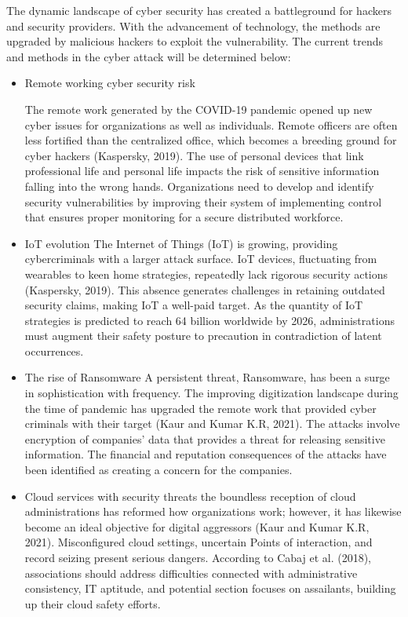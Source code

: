 The dynamic landscape of cyber security has created a battleground for hackers and security 
providers. With the advancement of technology, the methods are upgraded by malicious hackers to 
exploit the vulnerability. The current trends and methods in the cyber attack will be determined
below:
\begin{itemize}
     \item  Remote working cyber security risk

     The remote work generated by the COVID-19 pandemic opened up new cyber issues for 
     organizations as well as individuals. Remote officers are often less fortified than the 
     centralized office, which becomes a breeding ground for  cyber hackers (Kaspersky, 2019). 
     The use of personal devices that link professional life and personal life impacts the risk 
     of sensitive information falling into the wrong hands. Organizations need to develop and 
     identify security vulnerabilities by improving their system of implementing control that 
     ensures proper monitoring for a secure distributed workforce.
    \item IoT evolution 
    The Internet of Things (IoT) is growing, providing cybercriminals with a larger attack 
    surface. IoT devices, fluctuating from wearables to keen home strategies, repeatedly lack 
    rigorous security actions (Kaspersky, 2019). This absence generates challenges in retaining 
    outdated security claims, making IoT a well-paid target. As the quantity  of IoT strategies 
    is predicted to reach 64 billion worldwide by 2026, administrations must augment their 
    safety posture to precaution in contradiction of latent occurrences.

	\item The rise of Ransomware A persistent threat, Ransomware, has been a surge in 
 sophistication with frequency. 
    The improving digitization landscape during the time of pandemic has upgraded the remote 
    work that provided cyber criminals with their target (Kaur and Kumar K.R, 2021). The 
    attacks involve encryption of companies' data that provides a threat for releasing 
    sensitive information. The financial and reputation consequences of the attacks have been 
    identified as creating a concern for the companies.
    
    \item Cloud services with security threats the boundless reception of cloud administrations 
    has reformed how organizations work; however, it has likewise become an ideal objective for 
    digital aggressors (Kaur and Kumar K.R, 2021). Misconfigured cloud settings, uncertain 
    Points of interaction, and record seizing present serious dangers. According to Cabaj et al.
    (2018), associations should address difficulties connected with administrative consistency, 
    IT aptitude, and potential section focuses on assailants, building up their cloud safety 
    efforts.



\end{itemize}

